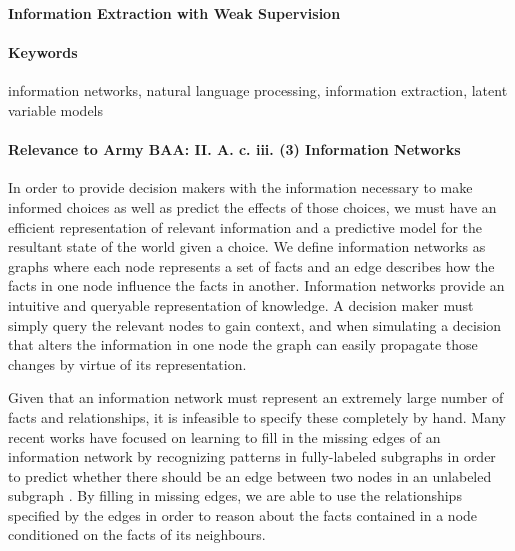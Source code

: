 \documentclass[11pt]{article}
\begin{document}

\begin{center}
\textbf{Information Extraction with Weak Supervision}
\end{center}

\begin{comment}
Spectrum from hard attention => hard segmental => HSMM for generative model, coverage / recall
Should we go into HSMM??? or is hard segmental attention enough

composition function = categorical over two entries of x

structured attention for IE posterior?
\end{comment}

\paragraph{Keywords}
information networks, natural language processing, information extraction, latent variable models

\paragraph{Relevance to Army BAA: II. A. c. iii. (3) Information Networks}
In order to provide decision makers with the information
necessary to make informed choices as well as predict the effects of those choices,
we must have an efficient representation of relevant information and a predictive model
for the resultant state of the world given a choice.
We define information networks as graphs where each node represents a set of facts
and an edge describes how the facts in one node influence the facts in another.
Information networks provide an intuitive and queryable representation of knowledge.
A decision maker must simply query the relevant nodes to gain context, and
when simulating a decision that alters the information in one node
the graph can easily propagate those changes by virtue of its representation.

Given that an information network must represent an extremely large number of facts and relationships,
it is infeasible to specify these completely by hand.
Many recent works have focused on learning to fill in the missing edges of an information network
by recognizing patterns in fully-labeled subgraphs in order to predict whether there should
be an edge between two nodes in an unlabeled subgraph \citep{chen2018diva}.
By filling in missing edges, we are able to use the relationships specified by the edges
in order to reason about the facts contained in a node conditioned on the facts of its
neighbours.
\end{document}
